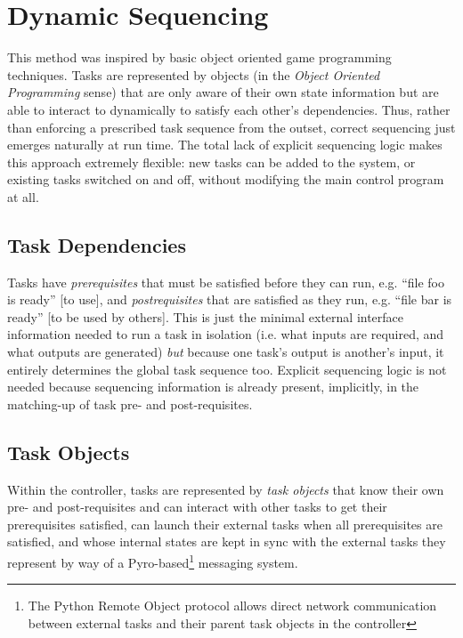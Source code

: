 \documentclass[12pt]{amsart}
\begin{document}
\section{Dynamic Sequencing}

This method was inspired by basic object oriented game programming
techniques. Tasks are represented by objects (in the {\em Object
Oriented Programming} sense) that are only aware of their own state
information but are able to interact to dynamically to satisfy each
other's dependencies.  Thus, rather than enforcing a prescribed task
sequence from the outset, correct sequencing just emerges naturally at
run time. The total lack of explicit sequencing logic makes this
approach extremely flexible: new tasks can be added to the system, or
existing tasks switched on and off, without modifying the main control
program at all.


\subsection{Task Dependencies}

Tasks have {\em prerequisites} that must be satisfied before they can
run, e.g. ``file foo is ready'' [to use], and {\em postrequisites} that
are satisfied as they run, e.g. ``file bar is ready'' [to be used by
others]. This is just the minimal external interface information needed
to run a task in isolation (i.e. what inputs are required, and what
outputs are generated) {\em but} because one task's output is another's
input, it entirely determines the global task sequence too. Explicit
sequencing logic is not needed because sequencing information is already
present, implicitly, in the matching-up of task pre- and
post-requisites. 

\subsection{Task Objects}

Within the controller, tasks are represented by {\em task objects} that
know their own pre- and post-requisites and can interact with other
tasks to get their prerequisites satisfied, can launch their external
tasks when all prerequisites are satisfied, and whose internal states
are kept in sync with the external tasks they represent by way of a
Pyro-based\footnote{The Python Remote Object protocol allows direct
network communication between external tasks and their parent task
objects in the controller} messaging system. 
\end{document}
